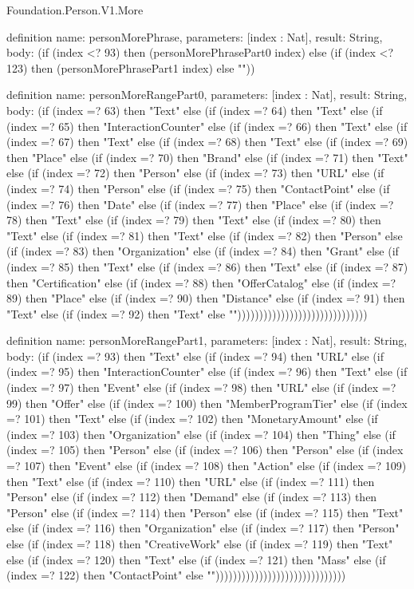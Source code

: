 \begin{lexlean}{Foundation.Person.V1.More}
\begin{semanticmodule}
definition{
  name: personMorePhrase,
  parameters: [index : Nat],
  result: String,
  body: (if (index <? 93) then (personMorePhrasePart0 index) else (if (index <? 123) then (personMorePhrasePart1 index) else ""))
}

definition{
  name: personMoreRangePart0,
  parameters: [index : Nat],
  result: String,
  body: (if (index =? 63) then "Text" else (if (index =? 64) then "Text" else (if (index =? 65) then "InteractionCounter" else (if (index =? 66) then "Text" else (if (index =? 67) then "Text" else (if (index =? 68) then "Text" else (if (index =? 69) then "Place" else (if (index =? 70) then "Brand" else (if (index =? 71) then "Text" else (if (index =? 72) then "Person" else (if (index =? 73) then "URL" else (if (index =? 74) then "Person" else (if (index =? 75) then "ContactPoint" else (if (index =? 76) then "Date" else (if (index =? 77) then "Place" else (if (index =? 78) then "Text" else (if (index =? 79) then "Text" else (if (index =? 80) then "Text" else (if (index =? 81) then "Text" else (if (index =? 82) then "Person" else (if (index =? 83) then "Organization" else (if (index =? 84) then "Grant" else (if (index =? 85) then "Text" else (if (index =? 86) then "Text" else (if (index =? 87) then "Certification" else (if (index =? 88) then "OfferCatalog" else (if (index =? 89) then "Place" else (if (index =? 90) then "Distance" else (if (index =? 91) then "Text" else (if (index =? 92) then "Text" else ""))))))))))))))))))))))))))))))
}

definition{
  name: personMoreRangePart1,
  parameters: [index : Nat],
  result: String,
  body: (if (index =? 93) then "Text" else (if (index =? 94) then "URL" else (if (index =? 95) then "InteractionCounter" else (if (index =? 96) then "Text" else (if (index =? 97) then "Event" else (if (index =? 98) then "URL" else (if (index =? 99) then "Offer" else (if (index =? 100) then "MemberProgramTier" else (if (index =? 101) then "Text" else (if (index =? 102) then "MonetaryAmount" else (if (index =? 103) then "Organization" else (if (index =? 104) then "Thing" else (if (index =? 105) then "Person" else (if (index =? 106) then "Person" else (if (index =? 107) then "Event" else (if (index =? 108) then "Action" else (if (index =? 109) then "Text" else (if (index =? 110) then "URL" else (if (index =? 111) then "Person" else (if (index =? 112) then "Demand" else (if (index =? 113) then "Person" else (if (index =? 114) then "Person" else (if (index =? 115) then "Text" else (if (index =? 116) then "Organization" else (if (index =? 117) then "Person" else (if (index =? 118) then "CreativeWork" else (if (index =? 119) then "Text" else (if (index =? 120) then "Text" else (if (index =? 121) then "Mass" else (if (index =? 122) then "ContactPoint" else ""))))))))))))))))))))))))))))))
}


\end{semanticmodule}
\end{lexlean}

